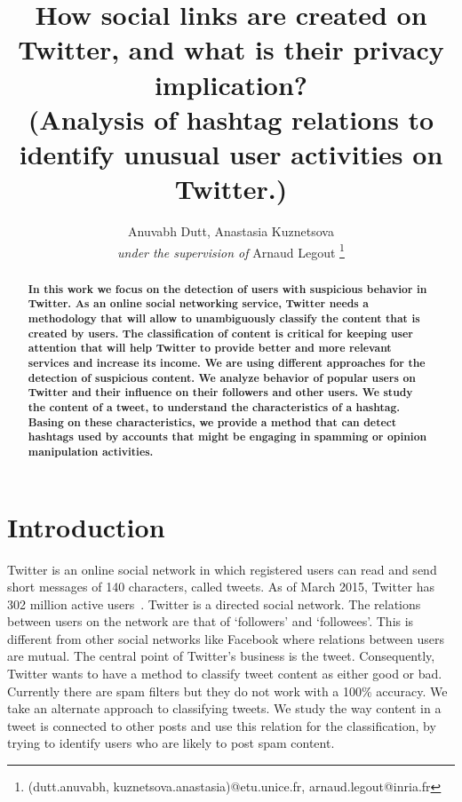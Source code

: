 \documentclass[journal, a4paper, 12pt]{article}
\begin{document}
	\title{How social links are created on Twitter, and what is their privacy implication?\\
    (Analysis of hashtag relations to identify unusual user activities on Twitter.)}
	\author{Anuvabh Dutt, Anastasia Kuznetsova \\ \textit{under the supervision of} Arnaud Legout
 	\thanks{(dutt.anuvabh, kuznetsova.anastasia)@etu.unice.fr, arnaud.legout@inria.fr}
    }
    
    \date{}
    
	\maketitle

\begin{abstract}
\textbf{In this work we focus on the detection of users with suspicious behavior in Twitter. As an online social networking service, Twitter needs a methodology that will allow to unambiguously classify the content that is created by users. The classification of content is critical for keeping user attention that will help Twitter to provide better and more relevant services and increase its income. We are using different approaches for the detection of suspicious content. We analyze behavior of popular users on Twitter and their influence on their followers and other users. We study the content of a tweet, to understand the characteristics of a hashtag. Basing on these characteristics, we provide a method that can detect hashtags used by accounts that might be engaging in spamming or opinion manipulation activities.}
\end{abstract}
\vspace*{\fill}
\pagebreak

\section{Introduction}
Twitter is an online social network in which registered users can read and send short messages of 140 characters, called tweets. As of March 2015, Twitter has 302 million active users~\cite{twitter_stats}. Twitter is a directed social network. The relations between users on the network are that of ‘followers’ and ‘followees’. This is different from other social networks like Facebook where relations between users are mutual. The central point of Twitter's business is the tweet. Consequently, Twitter wants to have a method to classify tweet content as either good or bad. Currently there are spam filters but they do not work with a 100\% accuracy.  We take an alternate approach to classifying tweets. We study the way content in a tweet is connected to other posts and use this relation for the classification, by trying to identify users who are likely to post spam content. \\
    
\end{document}
